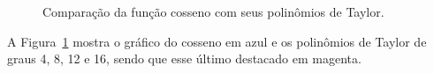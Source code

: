 \begin{figure}
  \begin{center}%
    \vspace{-0.2\baselineskip}%
    \scalebox{0.9}{}%
    \vspace{-\baselineskip}%
  \end{center}
  \caption{Comparação da função cosseno com seus polinômios de Taylor.}
  \label{fig:funcao_tayplor_cosseno}
\end{figure}

A Figura~\ref{fig:funcao_tayplor_cosseno} mostra o gráfico do cosseno
em azul e os polinômios de Taylor
de graus 4, 8, 12 e 16, sendo que esse último destacado em magenta.




